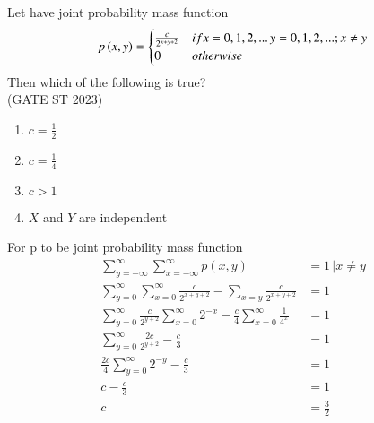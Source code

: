 \documentclass[journal,12pt,twocolumn]{IEEEtran}
\theoremstyle{remark}
\begin{document}
Let  have joint probability mass function 
\begin{align}
p\left(x,y\right)=  
	\begin{cases}
        \frac{c}{2^{x+y+2}} & if x=0,1,2,... \, y=0,1,2,...; x\neq y \\
        0 & otherwise
        \end{cases} 
\end{align} 
Then which of the following is true?\\
\hfill (GATE ST 2023) \\
\begin{enumerate}
\item $c = \frac{1}{2}$
\item $c = \frac{1}{4}$
\item $c > 1$
\item $X$ and $Y$ are independent
\end{enumerate}
\solution
For p to be joint probability mass function
\begin{align}
\sum\limits^{\infty}_{y=-\infty}\sum\limits^{\infty}_{x=-\infty}p(x,y)&=1 \, \vert x \neq y\\
\sum\limits^{\infty}_{y=0}\sum\limits^{\infty}_{x=0}\frac{c}{2^{x+y+2}}- \sum\limits_{x=y} \frac{c}{2^{x+y+2}}&=1\\
\sum\limits^{\infty}_{y=0}\frac{c}{2^{y+2}} \sum\limits^{\infty}_{x=0} 2^{-x}- \frac{c}{4}\sum\limits^{\infty}_{x=0}\frac{1}{4^x}&=1\\
\sum\limits^{\infty}_{y=0}\frac{2c}{2^{y+2}}- \frac{c}{3}&=1\\
\frac{2c}{4}\sum\limits^{\infty}_{y=0}2^{-y}-\frac{c}{3}&=1\\
c-\frac{c}{3}&=1\\
c&=\frac{3}{2}
\end{align}
\end{document}
